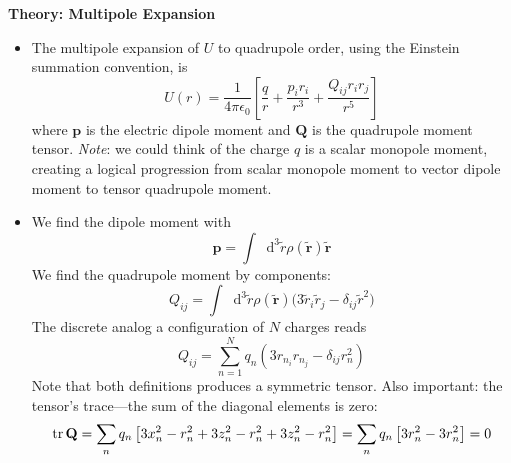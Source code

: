 \documentclass[11pt, a4paper]{article}
\newcommand{\diff}{\mathop{}\!\mathrm{d}} %
\renewcommand{\vec}[1]{\bm{#1}} %
\newcommand{\mat}[1]{\mathbf{#1}} %
\newcommand{\tvec}[1]{\tilde{\vec{#1}}} %
\newcommand{\e}{\epsilon_{0}} %
\begin{document}
\textbf{Theory: Multipole Expansion}
\begin{itemize}

	\item The multipole expansion of $ U $ to quadrupole order, using the Einstein summation convention, is
	\begin{equation*}
		U(r) = \frac{1}{4\pi \e} \left[\frac{q}{r} + \frac{p_{i}r_{i}}{r^{3}} + \frac{Q_{ij}r_{i}r_{j}}{r^{5}} \right]
	\end{equation*}
	where $ \vec{p} $ is the electric dipole moment and $ \mat{Q} $ is the quadrupole moment tensor. \textit{Note}: we could think of the charge $ q $ is a scalar monopole moment, creating a logical progression from scalar monopole moment to vector dipole moment to tensor quadrupole moment. 
	
	\item We find the dipole moment with 
	\begin{equation*}
		\vec{p} = \int  \diff^{3} \tilde{r} \rho(\tvec{r}) \tvec{r}
	\end{equation*}
	We find the quadrupole moment by components:
	\begin{equation*}
		Q_{ij} = \int  \diff^{3} \tilde{r} \rho(\tvec{r}) \big( 3\tilde{r}_{i}\tilde{r}_{j} - \delta_{ij}\tilde{r}^{2} \big)
	\end{equation*}
	The discrete analog a configuration of $ N $ charges reads
	\begin{equation*}
		Q_{ij} = \sum_{n=1}^{N} q_{n} \left(3r_{n_{i}}r_{n_{j}} - \delta_{ij}r_{n}^{2}\right)
	\end{equation*}
	Note that both definitions produces a symmetric tensor. Also important: the tensor's trace---the sum of the diagonal elements is zero:
	\begin{equation*}
		\tr\mat{Q} = \sum_{n} q_{n}\left[3x_{n}^{2} - r_{n}^{2} + 3z_{n}^{2} - r_{n}^{2} + 3z_{n}^{2} - r_{n}^{2} \right] = \sum_{n}q_{n}\left[3r_{n}^{2} - 3r_{n}^{2}\right] = 0
	\end{equation*}
\end{itemize}
\end{document}
